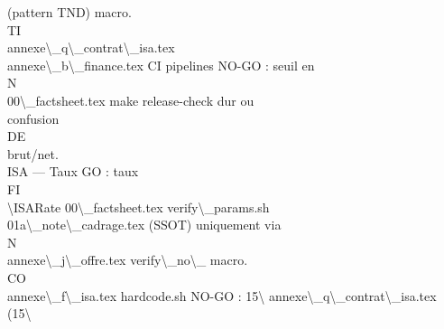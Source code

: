 (pattern TND)          macro.\\
\vspace{0.5em}
\vspace{0.5em}
\vspace{0.5em}
\vspace{0.5em}
TI\\
annexe\textbackslash{}_q\textbackslash{}_contrat\textbackslash{}_isa.tex\\
annexe\textbackslash{}_b\textbackslash{}_finance.tex       CI pipelines           NO-GO : seuil en\\
\vspace{0.5em}
\vspace{0.5em}
\vspace{0.5em}
\vspace{0.5em}
N\\
00\textbackslash{}_factsheet.tex           make release-check     dur ou\\
confusion\\
\vspace{0.5em}
\vspace{0.5em}
\vspace{0.5em}
\vspace{0.5em}
DE\\
brut/net.\\
ISA — Taux                                                                      GO : taux\\
\vspace{0.5em}
\vspace{0.5em}
\vspace{0.5em}
\vspace{0.5em}
FI\\
\textbackslash{}ISARate        00\textbackslash{}_factsheet.tex           verify\textbackslash{}_params.sh\\
01a\textbackslash{}_note\textbackslash{}_cadrage.tex       (SSOT)                 uniquement via\\
\vspace{0.5em}
\vspace{0.5em}
N\\
annexe\textbackslash{}_j\textbackslash{}_offre.tex         verify\textbackslash{}_no\textbackslash{}_             macro.\\
CO\\
annexe\textbackslash{}_f\textbackslash{}_isa.tex           hardcode.sh            NO-GO : 15\textbackslash{}%
annexe\textbackslash{}_q\textbackslash{}_contrat\textbackslash{}_isa.tex   (15\textbackslash{}%

